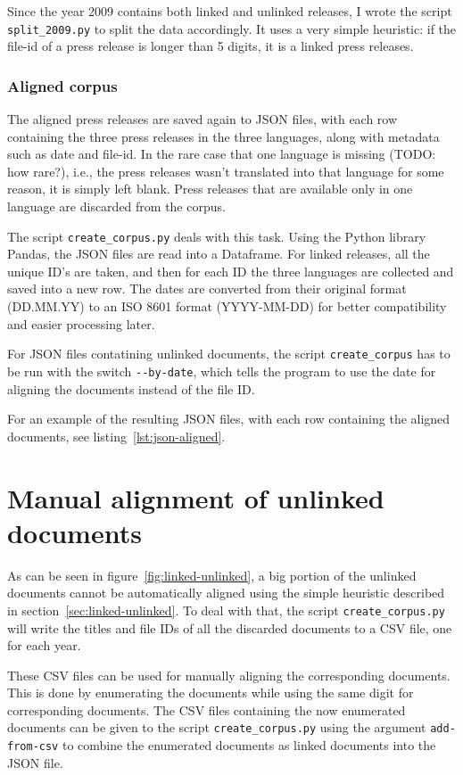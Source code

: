 Since the year 2009 contains both linked and unlinked releases, I wrote the script \texttt{split\_2009.py} to split the data accordingly. 
It uses a very simple heuristic: if the file-id of a press release is longer than 5 digits, it is a linked press releases.

\subsubsection{Aligned corpus}
The aligned press releases are saved again to JSON files, with each row containing the three press releases in the three languages, along with metadata such as date and file-id. 
In the rare case that one language is missing (TODO: how rare?), i.e., the press releases wasn't translated into that language for some reason, it is simply left blank. 
Press releases that are available only in one language are discarded from the corpus.

The script \texttt{create\_corpus.py} deals with this task.
Using the Python library Pandas, the JSON files are read into a Dataframe. 
For linked releases, all the unique ID's are taken, and then for each ID the three languages are collected and saved into a new row. 
The dates are converted from their original format (DD.MM.YY) to an ISO 8601 format (YYYY-MM-DD) \autocite{enwiki:1095673391} for better compatibility and easier processing later.

For JSON files contatining unlinked documents, the script \texttt{create\_corpus} has to be run with the switch \texttt{-{}-by-date}, which tells the program to use the date for aligning the documents instead of the file ID.

For an example of the resulting JSON files, with each row containing the aligned documents, see listing~\ref{lst:json-aligned}.


\section{Manual alignment of unlinked documents}
As can be seen in figure~\ref{fig:linked-unlinked}, a big portion of the unlinked documents cannot be automatically aligned using the simple heuristic described in section~\ref{sec:linked-unlinked}. 
To deal with that, the script \texttt{create\_corpus.py} will write the titles and file IDs of all the discarded documents to a CSV file, one for each year. 

These CSV files can be used for manually aligning the corresponding documents. 
This is done by enumerating the documents while using the same digit for corresponding documents. 
The CSV files containing the now enumerated documents can be given to the script \texttt{create\_corpus.py} using the argument \texttt{add-from-csv} to combine the enumerated documents as linked documents into the JSON file.

